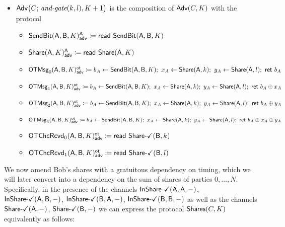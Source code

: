 \begin{itemize}
\item $\Adv\big(C; \, \andgate(k,l),K+1\big)$ is the composition of $\Adv(C,K)$ with the protocol
\begin{itemize}
\item {\color{blue} $\LeakSendBit(\A,\B,K)^\A_\adv \coloneqq \read{\SendBit(\A,\B,K)}$}
\item {\color{blue} $\LeakShare(\A,K)^\A_\adv \coloneqq \read{\Share(\A,K)}$}\smallskip
\item {\color{blue} $\LeakOTMsg_0(\A,\B,K)^\ot_\adv \coloneqq b_A \leftarrow \SendBit(\A,\B,K); \ x_A \leftarrow \Share(\A,k); \ y_A \leftarrow \Share(\A,l); \ \ret{b_A}$}
\item {\color{blue} $\LeakOTMsg_1(\A,\B,K)^\ot_\adv \coloneqq b_A \leftarrow \SendBit(\A,\B,K); \ x_A \leftarrow \Share(\A,k); \ y_A \leftarrow \Share(\A,l); \ \ret{b_A \oplus x_A}$}
\item {\color{blue} $\LeakOTMsg_2(\A,\B,K)^\ot_\adv \coloneqq b_A \leftarrow \SendBit(\A,\B,K); \ x_A \leftarrow \Share(\A,k); \ y_A \leftarrow \Share(\A,l); \ \ret{b_A \oplus y_A}$}
\item {\color{blue} $\LeakOTMsg_3(\A,\B,K)^\ot_\adv \coloneqq b_A \leftarrow \SendBit(\A,\B,K); \ x_A \leftarrow \Share(\A,k); \ y_A \leftarrow \Share(\A,l); \ \ret{b_A \oplus x_A \oplus y_A}$}\smallskip
\item {\color{blue} $\LeakOTChcRcvd_0(\A,\B,K)^\ot_\adv \coloneqq \read{\ShareOk(\B,k)}$}
\item {\color{blue} $\LeakOTChcRcvd_1(\A,\B,K)^\ot_\adv \coloneqq \read{\ShareOk(\B,l)}$}
\end{itemize}
\end{itemize}

We now amend Bob's shares with a gratuitous dependency on timing, which we will later convert into a dependency on the sum of shares of parties $0,\ldots,N$. Specifically, in the presence of the channels $\InShareOk(\A,\A,-)$, $\InShareOk(\A,\B,-)$, $\InShareOk(\B,\A,-)$, $\InShareOk(\B,\B,-)$ as well as the channels $\ShareOk(\A,-)$, $\ShareOk(\B,-)$ we can express the protocol $\Shares(C,K)$ equivalently as follows:

